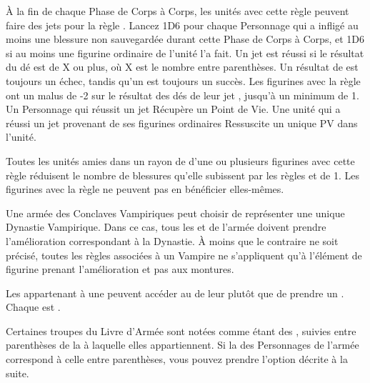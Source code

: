 \vspace*{5pt}À la fin de chaque Phase de Corps à Corps, les unités avec cette règle peuvent faire des jets pour la règle \vampiric{}. Lancez 1D6 pour chaque Personnage \vampiric{} qui a infligé au moins une blessure non sauvegardée durant cette Phase de Corps à Corps, et 1D6 si au moins une figurine ordinaire \vampiric{} de l'unité l'a fait. Un jet \vampiric{} est réussi si le résultat du dé est de X ou plus, où X est le nombre entre parenthèses. Un résultat de  est toujours un échec, tandis qu'un  est toujours un succès. Les figurines avec la règle \largetarget{} ont un malus de -2 sur le résultat des dés de leur jet \vampiric{}, jusqu'à un minimum de 1. Un Personnage qui réussit un jet \vampiric{} Récupère un Point de Vie. Une unité qui a réussi un jet \vampiric{} provenant de ses figurines ordinaires Ressuscite un unique PV dans l'unité.

\armyspecialruleentry{\necromanticaura}

Toutes les unités amies dans un rayon de  d'une ou plusieurs figurines avec cette règle réduisent le nombre de blessures qu'elle subissent par les règles \ashestoashes{} et \unstable{} de 1. Les figurines avec la règle \necromanticaura{} ne peuvent pas en bénéficier elles-mêmes.


\closearmyspecialrules







\newpage
{}

\spaceaftersection{}

Une armée des Conclaves Vampiriques peut choisir de représenter une unique Dynastie Vampirique. Dans ce cas, tous les \vampirelords{} et \vampireheroes{} de l'armée doivent prendre l'amélioration correspondant à la Dynastie. À moins que le contraire ne soit précisé, toutes les règles associées à un Vampire ne s'appliquent qu'à l'élément de figurine prenant l'amélioration et pas aux montures.


Les \vampirelords{} appartenant à une \bloodline{} peuvent accéder au \ancientbloodpower{} de leur \bloodline{} plutôt que de prendre un \bloodpower{}. Chaque \ancientbloodpower{} est \oneofakind{}.


Certaines troupes du Livre d'Armée sont notées comme étant des \bloodties{}, suivies entre parenthèses de la \bloodline{} à laquelle elles appartiennent. Si la \bloodline{} des Personnages \vampires{} de l'armée correspond à celle entre parenthèses, vous pouvez prendre l'option décrite à la suite.

